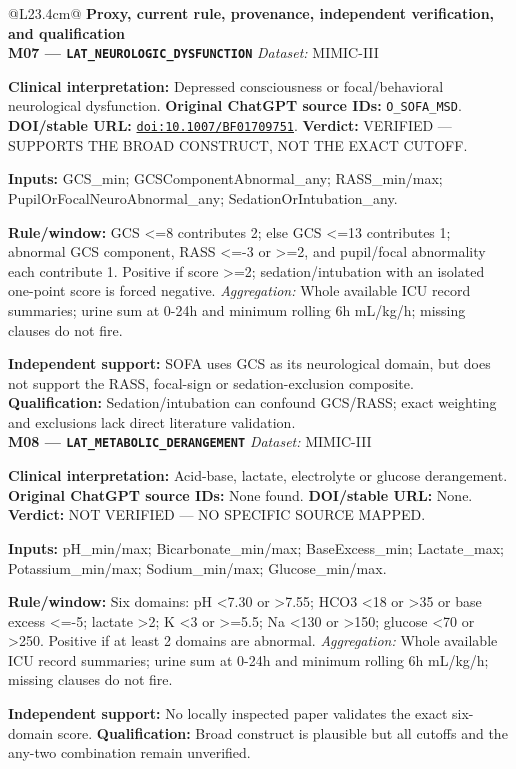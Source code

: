 \begin{tabular}{@{}L{23.4cm}@{}}
\toprule
\textbf{Proxy, current rule, provenance, independent verification, and qualification}\\
\midrule
\textbf{M07 --- \nolinkurl{LAT_NEUROLOGIC_DYSFUNCTION}} \hfill \textit{Dataset:} MIMIC-III\par\textbf{Clinical interpretation:} Depressed consciousness or focal/behavioral neurological dysfunction. \textbf{Original ChatGPT source IDs:} \nolinkurl{O_SOFA_MSD}. \textbf{DOI/stable URL:} \href{https://doi.org/10.1007/BF01709751}{\nolinkurl{doi:10.1007/BF01709751}}. \textbf{Verdict:} VERIFIED --- SUPPORTS THE BROAD CONSTRUCT, NOT THE EXACT CUTOFF.\par\textbf{Inputs:} GCS\_min; GCSComponentAbnormal\_any; RASS\_min/max; PupilOrFocalNeuroAbnormal\_any; SedationOrIntubation\_any.\par\textbf{Rule/window:} GCS <=8 contributes 2; else GCS <=13 contributes 1; abnormal GCS component, RASS <=-3 or >=2, and pupil/focal abnormality each contribute 1. Positive if score >=2; sedation/intubation with an isolated one-point score is forced negative. \textit{Aggregation:} Whole available ICU record summaries; urine sum at 0-24h and minimum rolling 6h mL/kg/h; missing clauses do not fire.\par\textbf{Independent support:} SOFA uses GCS as its neurological domain, but does not support the RASS, focal-sign or sedation-exclusion composite. \textbf{Qualification:} Sedation/intubation can confound GCS/RASS; exact weighting and exclusions lack direct literature validation. \\
\addlinespace[3pt]
\midrule
\textbf{M08 --- \nolinkurl{LAT_METABOLIC_DERANGEMENT}} \hfill \textit{Dataset:} MIMIC-III\par\textbf{Clinical interpretation:} Acid-base, lactate, electrolyte or glucose derangement. \textbf{Original ChatGPT source IDs:} None found. \textbf{DOI/stable URL:} None. \textbf{Verdict:} NOT VERIFIED --- NO SPECIFIC SOURCE MAPPED.\par\textbf{Inputs:} pH\_min/max; Bicarbonate\_min/max; BaseExcess\_min; Lactate\_max; Potassium\_min/max; Sodium\_min/max; Glucose\_min/max.\par\textbf{Rule/window:} Six domains: pH <7.30 or >7.55; HCO3 <18 or >35 or base excess <=-5; lactate >2; K <3 or >=5.5; Na <130 or >150; glucose <70 or >250. Positive if at least 2 domains are abnormal. \textit{Aggregation:} Whole available ICU record summaries; urine sum at 0-24h and minimum rolling 6h mL/kg/h; missing clauses do not fire.\par\textbf{Independent support:} No locally inspected paper validates the exact six-domain score. \textbf{Qualification:} Broad construct is plausible but all cutoffs and the any-two combination remain unverified. \\

\end{tabular}
